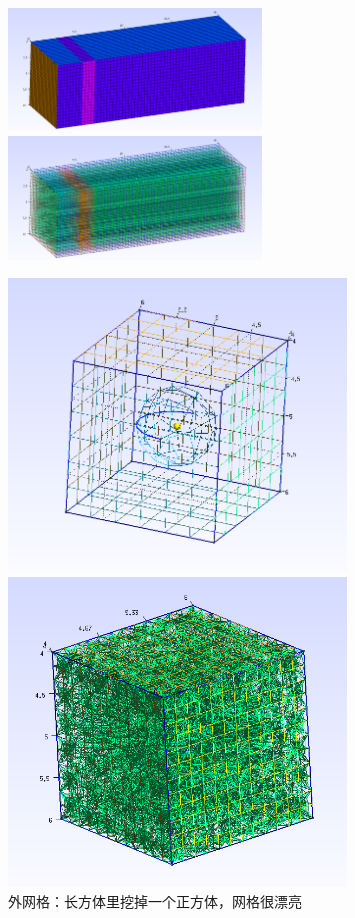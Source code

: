 \documentclass[lang=cn,11pt,a4paper]{elegantpaper}
\begin{document}
\begin{figure}[H]
    \centering
    \includegraphics[width=0.6\textwidth]{png/outer.png}
    \includegraphics[width=0.6\textwidth]{png/outer-volume.png}
    \caption{外网格：长方体里挖掉一个正方体，网格很漂亮}
    \begin{minipage}[t]{0.45\textwidth}
        \centering
        \includegraphics[width=0.8\textwidth]{png/inner.png}
    \end{minipage}
    \begin{minipage}[t]{0.45\textwidth}
        \centering
        \includegraphics[width=0.8\textwidth]{png/inner-volume.png}

\end{minipage}
\end{figure}
\end{document}
